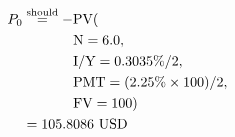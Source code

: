 \begin{align*}
P_{0}&\overset{\text{should}}{=}-\text{PV}(\\
	&\hspace{.5in}\text{N}=6.0,\\
	&\hspace{.5in}\text{I/Y}=0.3035\%/2,\\
	&\hspace{.5in}\text{PMT}=(2.25\%\times 100)/2,\\
	&\hspace{.5in}\text{FV}=100)\\
	&=105.8086\text{ USD}
\end{align*}
